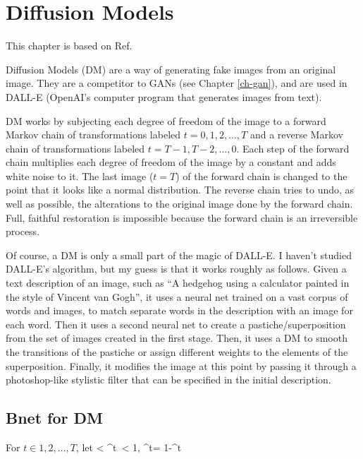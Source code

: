 \chapter{Diffusion Models}
\label{ch-diffusion}
\newcommand{\prodalp}[0]{\pi_1^t\alp}

This chapter is based on
 Ref.\cite{weng-diffusion-model}

Diffusion Models (DM)
are a way of generating 
fake images from an
original image.
They are a competitor 
to GANs (see Chapter \ref{ch-gan}),
and are used in DALL-E 
(OpenAI's 
computer program
that generates images from text).


DM works by
subjecting
each degree of freedom 
of the image 
to a forward Markov
chain
of transformations
labeled $t=0, 1, 2, \ldots, T$
and a reverse Markov
chain of transformations
labeled $t=T-1, T-2, \ldots,
0$.
Each step
of the forward chain
multiplies each degree
of freedom
of the image by a constant
and adds white noise
to it.
The last  image  ($t=T$)
of the forward chain is
changed to the
point that it looks
like a normal distribution.
The reverse chain tries
to undo,
as well as possible, the alterations
to the original image
done by the forward chain.
Full, faithful restoration
is impossible
because the
forward chain
is an irreversible 
process.

Of course, a DM
is only a small part of the magic of DALL-E. I haven't
studied DALL-E's algorithm,
but my guess is that it works roughly as follows.
Given a text description
of an image, such as  
\enquote{A hedgehog using a calculator
painted
in the style of Vincent van Gogh},
it uses a neural net
trained on a vast corpus of 
words and images, to match
separate words in the description
 with an image
 for each word.
Then it uses a second neural net
to create a pastiche/superposition from
the set of images created in the first
stage. 
Then, it uses a DM
to smooth the transitions of the pastiche
or assign different
weights to the 
elements of the superposition.
Finally, it 
modifies
the image at this point
by passing it
through a 
photoshop-like stylistic filter
that can be specified
in the initial description.



\section{Bnet for DM}

For $t\in 1,2, \ldots , T$, let
< \alp^t\
< 1, \; \beta^t= 1-\alp^t
\eeq

